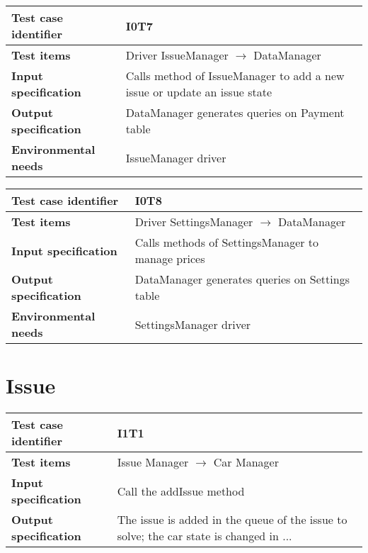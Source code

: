 \documentclass{scrreprt}
\begin{document}
\begin{center}
\begin{tabularx}{\columnwidth}{>{\bfseries}lX}
\toprule
Test case identifier & I0T7\\
\midrule
Test items & Driver IssueManager $\longrightarrow$ DataManager\\
\midrule
Input specification & Calls method of IssueManager to add a new issue or update an issue state \\
\midrule
Output specification & DataManager generates queries on Payment table \\
\midrule
Environmental needs & IssueManager driver\\
\bottomrule
\end{tabularx}
\end{center}

\begin{center}
\begin{tabularx}{\columnwidth}{>{\bfseries}lX}
\toprule
Test case identifier & I0T8\\
\midrule
Test items & Driver SettingsManager $\longrightarrow$ DataManager\\
\midrule
Input specification & Calls methods of SettingsManager to manage prices \\
\midrule
Output specification & DataManager generates queries on Settings table \\
\midrule
Environmental needs & SettingsManager driver\\
\bottomrule
\end{tabularx}
\end{center}

\section{Issue}

\begin{center}
\begin{tabularx}{\columnwidth}{>{\bfseries}lX}
\toprule
Test case identifier & I1T1\\
\midrule
Test items & Issue Manager $\longrightarrow$ Car Manager\\
\midrule
Input specification & Call the addIssue method\\
\midrule
Output specification & The issue is added in the queue of the issue to solve; the car state is changed in ... \\
\bottomrule
\end{tabularx}
\end{center}
\end{document}
